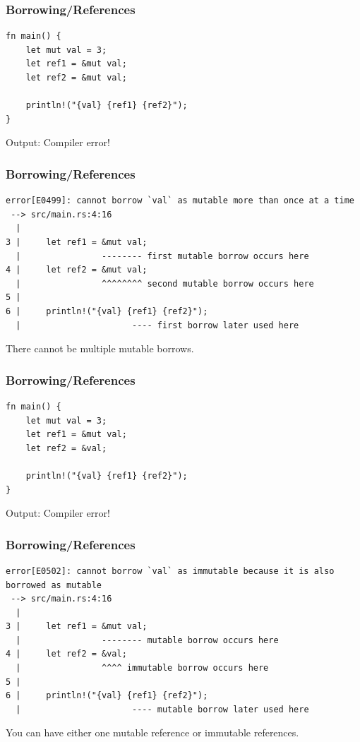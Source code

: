 \begin{frame}[fragile]
    \frametitle{Borrowing/References}
    \begin{verbatim}
fn main() {
    let mut val = 3;
    let ref1 = &mut val;
    let ref2 = &mut val;

    println!("{val} {ref1} {ref2}");
}
    \end{verbatim}
    \vfill
    Output:
    \pause
    \vfill
    Compiler error!
\end{frame}

\begin{frame}[fragile]
    \frametitle{Borrowing/References}
    \begin{verbatim}
error[E0499]: cannot borrow `val` as mutable more than once at a time
 --> src/main.rs:4:16
  |
3 |     let ref1 = &mut val;
  |                -------- first mutable borrow occurs here
4 |     let ref2 = &mut val;
  |                ^^^^^^^^ second mutable borrow occurs here
5 |
6 |     println!("{val} {ref1} {ref2}");
  |                      ---- first borrow later used here
    \end{verbatim}
    \pause
    \vfill
    There cannot be multiple mutable borrows.
\end{frame}

\begin{frame}[fragile]
    \frametitle{Borrowing/References}
    \begin{verbatim}
fn main() {
    let mut val = 3;
    let ref1 = &mut val;
    let ref2 = &val;

    println!("{val} {ref1} {ref2}");
}
    \end{verbatim}
    \vfill
    Output:
    \pause
    \vfill
    Compiler error!
\end{frame}

\begin{frame}[fragile]
    \frametitle{Borrowing/References}
    \begin{verbatim}
error[E0502]: cannot borrow `val` as immutable because it is also
borrowed as mutable
 --> src/main.rs:4:16
  |
3 |     let ref1 = &mut val;
  |                -------- mutable borrow occurs here
4 |     let ref2 = &val;
  |                ^^^^ immutable borrow occurs here
5 |
6 |     println!("{val} {ref1} {ref2}");
  |                      ---- mutable borrow later used here
    \end{verbatim}
    \pause
    \vfill
    You can have either one mutable reference or immutable references.
\end{frame}

